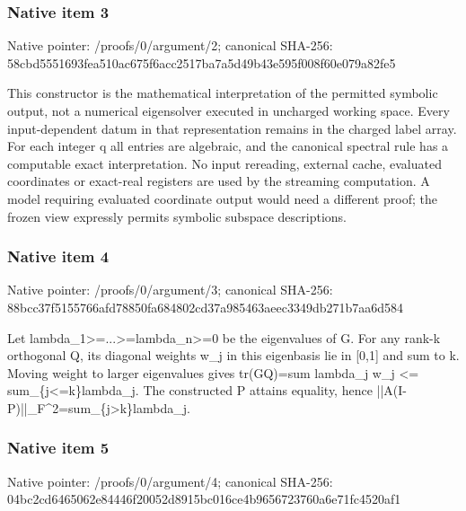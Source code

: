 \documentclass[10pt,a4paper]{article}
\begin{document}
\subsubsection{Native item 3}
Native pointer: /proofs/0/argument/2; canonical SHA-256: 58cbd5551693fea510ac675f6acc2517ba7a5d49b43e595f008f60e079a82fe5

\begingroup\raggedright\sloppy This constructor is the mathematical interpretation of the permitted symbolic output,\allowbreak{} not a numerical eigensolver executed in uncharged working space. Every input-dependent datum in that representation remains in the charged label array. For each integer q all entries are algebraic,\allowbreak{} and the canonical spectral rule has a computable exact interpretation. No input rereading,\allowbreak{} external cache,\allowbreak{} evaluated coordinates or exact-real registers are used by the streaming computation. A model requiring evaluated coordinate output would need a different proof;\allowbreak{} the frozen view expressly permits symbolic subspace descriptions.\par\endgroup

\subsubsection{Native item 4}
Native pointer: /proofs/0/argument/3; canonical SHA-256: 88bcc37f5155766afd78850fa684802cd37a985463aeec3349db271b7aa6d584

\begingroup\raggedright\sloppy Let lambda\_\allowbreak{}1>=\allowbreak{}...>=\allowbreak{}lambda\_\allowbreak{}n>=\allowbreak{}0 be the eigenvalues of G. For any rank-k orthogonal Q,\allowbreak{} its diagonal weights w\_\allowbreak{}j in this eigenbasis lie in [0,\allowbreak{}1] and sum to k. Moving weight to larger eigenvalues gives tr(GQ)=\allowbreak{}sum lambda\_\allowbreak{}j w\_\allowbreak{}j <=\allowbreak{} sum\_\allowbreak{}\{j<=\allowbreak{}k\}lambda\_\allowbreak{}j. The constructed P attains equality,\allowbreak{} hence ||A(I-P)||\_\allowbreak{}F\textasciicircum{}2=\allowbreak{}sum\_\allowbreak{}\{j>k\}lambda\_\allowbreak{}j.\par\endgroup

\subsubsection{Native item 5}
Native pointer: /proofs/0/argument/4; canonical SHA-256: 04bc2cd6465062e84446f20052d8915bc016ce4b9656723760a6e71fc4520af1
\end{document}
